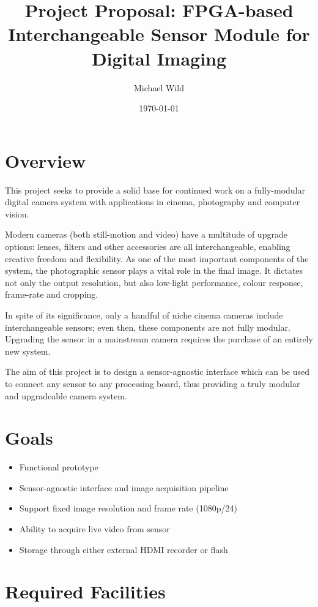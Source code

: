 \documentclass[a4paper]{article}
\title{Project Proposal: FPGA-based Interchangeable Sensor Module for Digital Imaging}
\author{Michael Wild}
\date{\today}
\begin{document}
\maketitle

\section{Overview}

This project seeks to provide a solid base for continued work on a fully-modular digital camera system with applications in cinema, photography and computer vision.

Modern cameras (both still-motion and video) have a multitude of upgrade options: lenses, filters and other accessories are all interchangeable, enabling creative freedom and flexibility. As one of the most important components of the system, the photographic sensor plays a vital role in the final image. It dictates not only the output resolution, but also low-light performance, colour response, frame-rate and cropping. 

In spite of its significance, only a handful of niche cinema cameras include interchangeable sensors; even then, these components are not fully modular. Upgrading the sensor in a mainstream camera requires the purchase of an entirely new system.

The aim of this project is to design a sensor-agnostic interface which can be used to connect any sensor to any processing board, thus providing a truly modular and upgradeable camera system.

\section{Goals}

\begin{itemize}
\item Functional prototype 
\item Sensor-agnostic interface and image acquisition pipeline
\item Support fixed image resolution and frame rate (1080p/24)
\item Ability to acquire live video from sensor
\item Storage through either external HDMI recorder or flash
\end{itemize}

\section{Required Facilities}
\end{document}
